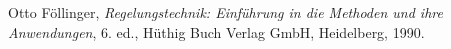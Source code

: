 \begin{thebibliography}

Otto Föllinger, \emph{Regelungstechnik: Einführung in die Methoden und ihre
  Anwendungen}, 6. ed., Hüthig Buch Verlag GmbH, Heidelberg, 1990.


\end{thebibliography}
